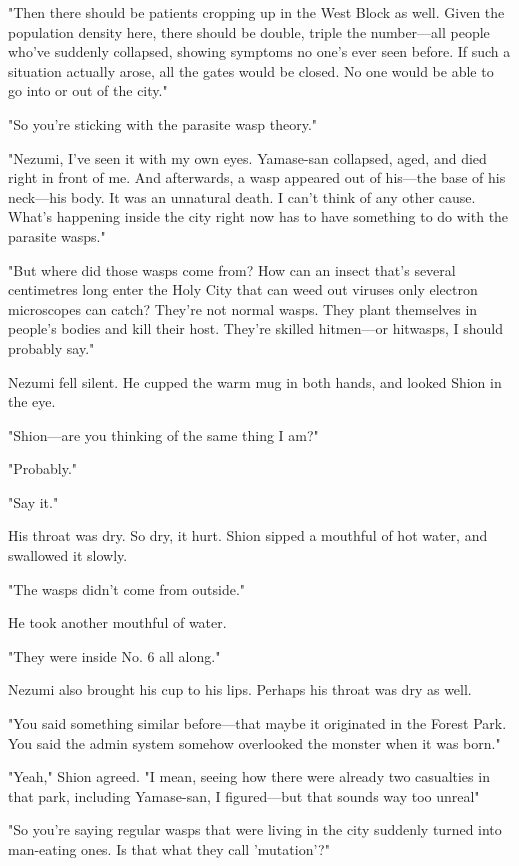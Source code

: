 "Then there should be patients cropping up in the West Block as well.
Given the population density here, there should be double, triple the
number---all people who've suddenly collapsed, showing symptoms no one's
ever seen before. If such a situation actually arose, all the gates
would be closed. No one would be able to go into or out of the city."

"So you're sticking with the parasite wasp theory."

"Nezumi, I've seen it with my own eyes. Yamase-san collapsed, aged, and
died right in front of me. And afterwards, a wasp appeared out of
his---the base of his neck---his body. It was an unnatural death. I can't
think of any other cause. What's happening inside the city right now has
to have something to do with the parasite wasps."

"But where did those wasps come from? How can an insect that's several
centimetres long enter the Holy City that can weed out viruses only
electron microscopes can catch? They're not normal wasps. They plant
themselves in people's bodies and kill their host. They're skilled
hitmen---or hitwasps, I should probably say."

Nezumi fell silent. He cupped the warm mug in both hands, and looked
Shion in the eye.

"Shion---are you thinking of the same thing I am?"

"Probably."

"Say it."

His throat was dry. So dry, it hurt. Shion sipped a mouthful of hot
water, and swallowed it slowly.

"The wasps didn't come from outside."

He took another mouthful of water.

"They were inside No. 6 all along."

Nezumi also brought his cup to his lips. Perhaps his throat was dry as
well.

"You said something similar before---that maybe it originated in the
Forest Park. You said the admin system somehow overlooked the monster
when it was born."

"Yeah," Shion agreed. "I mean, seeing how there were already two
casualties in that park, including Yamase-san, I figured---but that sounds
way too unreal\el "

"So you're saying regular wasps that were living in the city suddenly
turned into man-eating ones. Is that what they call 'mutation'?"

